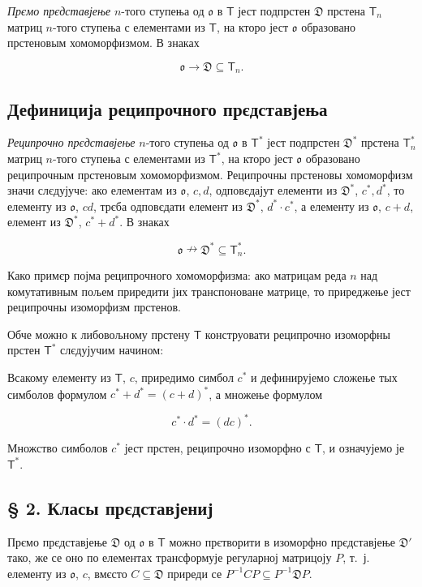 \documentclass[11pt]{article}
\begin{document}
\emph{Прємо прєдставјење} \(n\)-того ступења од \(\mathfrak{o}\) в \(\mathsf T\) јест подпрстен \(\mathfrak D\) прстена \(\mathsf T_n\) матриц \(n\)-того ступења с елементами из \(\mathsf T\), на кторо јест \(\mathfrak{o}\) образовано прстеновым хомоморфизмом. В знаках

\[
\mathfrak{o}\to\mathfrak D\subseteq\mathsf T_n.
\]

\subsection*{Дефиниција реципрочного прєдставјења}\label{definition-der-reziproken-darstellung}

\emph{Реципрочно прєдставјење} \(n\)-того ступења од \(\mathfrak{o}\) в \(\mathsf T^*\) јест подпрстен \(\mathfrak D^*\) прстена \(\mathsf T_n^*\) матриц \(n\)-того ступења с елементами из \(\mathsf T^*\), на кторо јест \(\mathfrak{o}\) образовано реципрочным прстеновым хомоморфизмом. Реципрочны прстеновы хомоморфизм значи слєдујуче: ако елементам из \(\mathfrak{o}\), \(c,d\), одповєдајут елементи из \(\mathfrak D^*\), \(c^*,d^*\), то елементу из \(\mathfrak{o}\), \(cd\), трєба одповєдати елемент из \(\mathfrak D^*\), \(d^*\cdot c^*\), а елементу из \(\mathfrak{o}\), \(c+d\), елемент из \(\mathfrak D^*\), \(c^*+d^*\). В знаках

\[
\mathfrak{o}\nrightarrow\mathfrak D^*\subseteq\mathsf T_n^*.
\]

Како примєр појма реципрочного хомоморфизма: ако матрицам реда \(n\) над комутативным пољем приредити јих транспоноване матрице, то приреджење јест реципрочны изоморфизм прстенов.

Обче можно к либовољному прстену \(\mathsf T\) конструовати реципрочно изоморфны прстен \(\mathsf T^*\) слєдујучим начином:

Всакому елементу из \(\mathsf T\), \(c\), приредимо симбол \(c^*\) и дефинирујемо сложење тых симболов формулом \(c^*+d^*=(c+d)^*\), а множење формулом

\[
c^*\cdot d^*=(dc)^*.
\]

Множство симболов \(c^*\) јест прстен, реципрочно изоморфно с \(\mathsf T\), и означујемо је \(\mathsf T^*\).

\subsection*{§ 2. Класы прєдставјениј}\label{darstellungsklassen}

Прємо прєдставјење \(\mathfrak D\) од \(\mathfrak{o}\) в \(\mathsf T\) можно прєтворити в изоморфно прєдставјење \(\mathfrak D'\) тако, же се оно по елементах трансформује регуларној матрицоју \(P\), т.~ј. елементу из \(\mathfrak{o}\), \(c\), вмєсто \(C\subseteq\mathfrak D\) приреди се \(P^{-1}CP\subseteq P^{-1}\mathfrak D P\).
\end{document}
